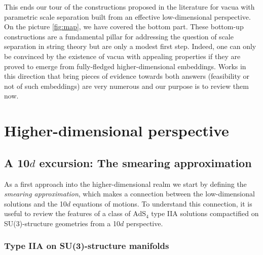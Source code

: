 \documentclass[11pt, a4paper]{article}
\renewcommand{\bm}{\boldmath}
\begin{document}
This ends our tour of the constructions proposed in the literature for vacua with parametric scale separation built from an effective low-dimensional perspective. On the picture \ref{fig:map}, we have covered the bottom part. These bottom-up constructions are a fundamental pillar for addressing the question of scale separation in string theory but are only a modest first step. Indeed, one can only be convinced by the existence of vacua with appealing properties if they are proved to emerge from fully-fledged higher-dimensional embeddings. Works in this direction that bring pieces of evidence towards both answers (feasibility or not of such embeddings) are very numerous and our purpose is to review them now. 

\section{Higher-dimensional perspective}
\label{sec:higher}

\subsection[A 10$d$ excursion: The smearing approximation]{\bm A 10$d$ excursion: The smearing approximation}
\label{sec:smeared}

As a first approach into the higher-dimensional realm we start by defining the \emph{smearing approximation}, which makes a connection between the low-dimensional solutions and the 10$d$ equations of motions. To understand this connection, it is useful to review the features of a class of AdS$_4$ type IIA solutions compactified on SU(3)-structure geometries from a 10$d$ perspective. 

\subsubsection{Type IIA on SU(3)-structure manifolds}
\end{document}
